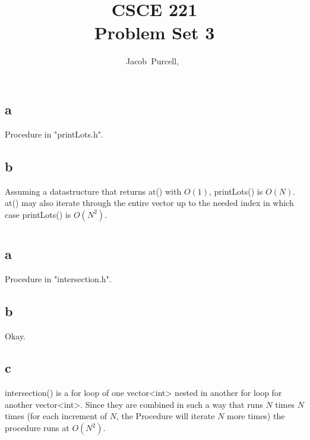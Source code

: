 \documentclass[journal]{IEEEtran}
\begin{document}
\title{CSCE 221 \\ Problem Set 3}

\author{Jacob~Purcell,~}

\maketitle
\section{}
\subsection*{a}

Procedure in "printLots.h".

\subsection*{b}

Assuming a datastructure that returns at() with $O(1)$, printLots() is $\boxed{O(N)}$. at() may also
iterate through the entire vector up to the needed index in which case printLots() is $O(N^2)$.


\section{}

\subsection*{a}
Procedure in "intersection.h".

\subsection*{b}
Okay.

\subsection*{c}
intersection() is a for loop of one vector<int> nested in another for loop for another vector<int>. Since 
they are combined in such a way that runs $N$ times $N$ times (for each increment of $N$, the Procedure 
will iterate $N$ more times) the procedure runs at $O(N^2)$. 

\section{}
\end{document}
